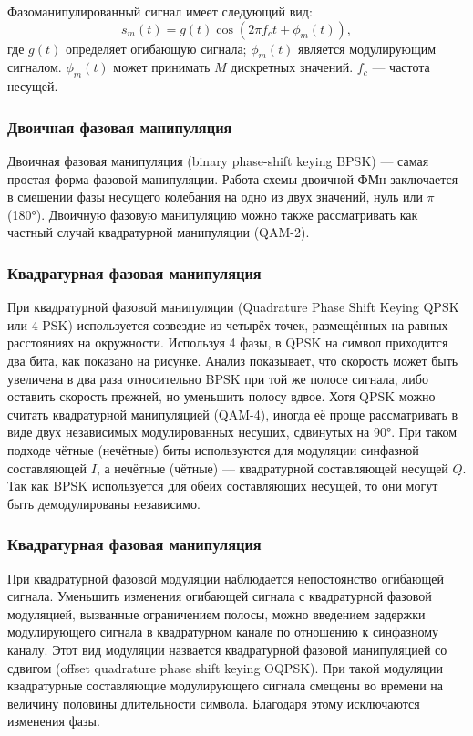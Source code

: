 Фазоманипулированный сигнал имеет следующий вид:
$$ s_m(t) = g(t) \cos(2 \pi f_ct + \phi_m(t)), $$
где $g(t)$ определяет огибающую сигнала; $\phi_m(t)$ является модулирующим сигналом. $\phi_m(t)$  может принимать  $M$ дискретных значений. $f_c$  — частота несущей.

\subsubsection{Двоичная фазовая манипуляция}
Двоичная фазовая манипуляция (binary phase-shift keying BPSK) — самая простая форма фазовой манипуляции. Работа схемы двоичной ФМн заключается в смещении фазы несущего колебания на одно из двух значений, нуль или $\pi$(180°). Двоичную фазовую манипуляцию можно также рассматривать как частный случай квадратурной манипуляции (QAM-2).

\subsubsection{Квадратурная фазовая манипуляция}
При квадратурной фазовой манипуляции (Quadrature Phase Shift Keying QPSK или 4-PSK) используется созвездие из четырёх точек, размещённых на равных расстояниях на окружности. Используя 4 фазы, в QPSK на символ приходится два бита, как показано на рисунке. Анализ показывает, что скорость может быть увеличена в два раза относительно BPSK при той же полосе сигнала, либо оставить скорость прежней, но уменьшить полосу вдвое.
Хотя QPSK можно считать квадратурной манипуляцией (QAM-4), иногда её проще рассматривать в виде двух независимых модулированных несущих, сдвинутых на 90°. При таком подходе чётные (нечётные) биты используются для модуляции синфазной составляющей 	$I$, а нечётные (чётные) — квадратурной составляющей несущей $Q$. Так как BPSK используется для обеих составляющих несущей, то они могут быть демодулированы независимо.

\subsubsection{Квадратурная фазовая манипуляция}
При квадратурной фазовой модуляции наблюдается непостоянство огибающей сигнала. Уменьшить изменения огибающей сигнала с квадратурной фазовой модуляцией, вызванные ограничением полосы, можно введением задержки модулирующего сигнала в квадратурном канале по отношению к синфазному каналу. Этот вид модуляции назвается квадратурной фазовой манипуляцией со сдвигом (offset quadrature phase shift keying OQPSK). При такой модуляции квадратурные составляющие модулирующего сигнала смещены во времени на величину половины длительности символа. Благодаря этому исключаются изменения фазы.


